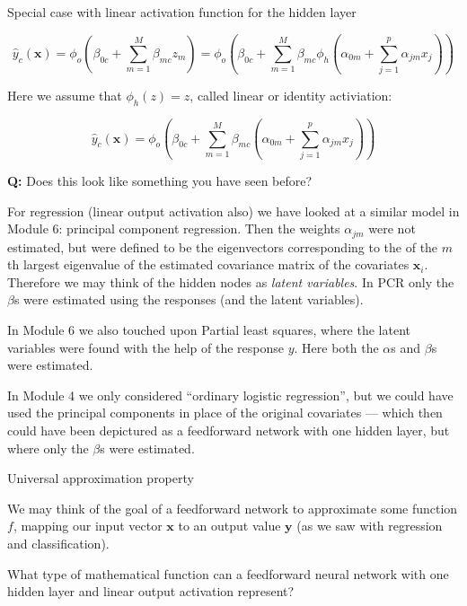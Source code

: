 \documentclass[10pt,ignorenonframetext,]{beamer}
\begin{document}
\begin{frame}

\begin{block}{Special case with linear activation function for the
hidden layer}

\[
\hat{y}_c({\boldsymbol x})=\phi_o(\beta_{0c}+\sum_{m=1}^M \beta_{mc}z_{m})=\phi_o(\beta_{0c}+\sum_{m=1}^M \beta_{mc}\phi_h(\alpha_{0m}+\sum_{j=1}^p \alpha_{jm}x_{j}))
\]

Here we assume that \(\phi_h(z)=z\), called linear or identity
activiation:

\[
\hat{y}_c({\boldsymbol x})=\phi_o(\beta_{0c}+\sum_{m=1}^M \beta_{mc}(\alpha_{0m}+\sum_{j=1}^p \alpha_{jm}x_{j}))
\]

\textbf{Q:} Does this look like something you have seen before?

\end{block}

\end{frame}

\begin{frame}

For regression (linear output activation also) we have looked at a
similar model in Module 6: principal component regression. Then the
weights \(\alpha_{jm}\) were not estimated, but were defined to be the
eigenvectors corresponding to the of the \(m\)th largest eigenvalue of
the estimated covariance matrix of the covariates \({\boldsymbol x}_i\).
Therefore we may think of the hidden nodes as \emph{latent variables}.
In PCR only the \(\beta\)s were estimated using the responses (and the
latent variables).

In Module 6 we also touched upon Partial least squares, where the latent
variables were found with the help of the response \(y\). Here both the
\(\alpha\)s and \(\beta\)s were estimated.

In Module 4 we only considered ``ordinary logistic regression'', but we
could have used the principal components in place of the original
covariates --- which then could have been depictured as a feedforward
network with one hidden layer, but where only the \(\beta\)s were
estimated.

\end{frame}

\begin{frame}

\begin{block}{Universal approximation property}

We may think of the goal of a feedforward network to approximate some
function \(f\), mapping our input vector \({\boldsymbol x}\) to an
output value \({\boldsymbol y}\) (as we saw with regression and
classification).

What type of mathematical function can a feedforward neural network with
one hidden layer and linear output activation represent?

\end{block}

\end{frame}
\end{document}
